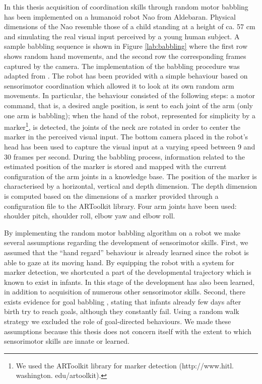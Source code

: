 In this thesis acquisition of coordination skills through random 
motor babbling has been implemented on a humanoid robot Nao from Aldebaran. 
Physical dimensions of the Nao resemble those of a child standing at a height of 
ca. 57 cm and simulating the real visual input perceived by a young human 
subject. A sample babbling sequence is shown in Figure \ref{lab:babbling} where 
the first row shows random hand movements, and the second row the corresponding 
frames captured by the camera. The implementation of the babbling procedure was 
adapted from \citep{SchillaciH11}. The robot has been provided with a simple 
behaviour based on sensorimotor coordination which allowed it to look at its own 
random arm movements. In particular, the behaviour consisted of the following 
steps: a motor command, that is, a desired angle position, is sent to each joint 
of the arm (only one arm is babbling); when the hand of the robot, represented 
for simplicity by a marker\footnote{We used the ARToolkit library for marker 
detection (http://www.hitl.
washington.
edu/artoolkit).}, is detected, the joints of the neck are rotated in order to center the marker in the perceived visual input. 
The bottom camera placed in the robot's head has been used to capture the visual input at a varying speed between 9 and 30 frames per second.
During the babbling process, information related to the estimated position of the marker is stored and mapped with the current configuration of the arm joints in a knowledge base. 
The position of the marker is characterised by a horizontal, vertical and depth dimension. The depth dimension is computed based on the dimensions of a marker provided through a configuration file to the ARToolkit library.
Four arm joints have been used: shoulder pitch, shoulder roll, elbow yaw and elbow roll. 

By implementing the random motor babbling algorithm on a robot we make several assumptions regarding the development of sensorimotor skills. First, we assumed that the ``hand regard'' behaviour is already learned since the robot is able to gaze at its moving hand. By equipping the robot with a system for marker detection, we shortcuted a part of the developmental trajectory which is known to exist in infants. 
In \citep{Metta2000} this stage of the development has also been learned, in addition to acquisition of numerous other sensorimotor skills.
Second, there exists evidence for goal babbling \citep{rolfs2012}, stating that infants already few days after birth try to reach goals, although they constantly fail. Using a random walk strategy we excluded the role of goal-directed behaviours. We made these assumptions because this thesis does not concern itself with the extent to which sensorimotor skills are innate or learned.


